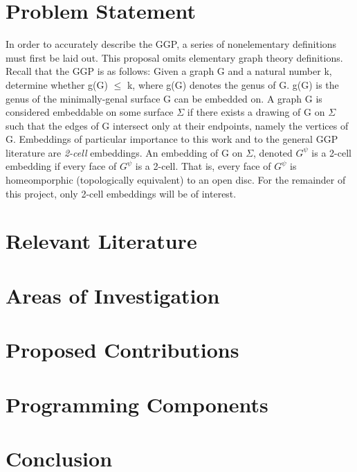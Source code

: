 \documentclass[12pt,conference]{IEEEtran}
\begin{document}
\section{Problem Statement}

In order to accurately describe the GGP, a series of nonelementary definitions must first be laid out. This proposal omits elementary graph theory definitions.
Recall that the GGP is as follows: Given a graph G and a natural number k, determine whether g(G) $\leq$ k, where g(G) denotes the genus of G. g(G) is the genus of the minimally-genal surface G can be embedded on. A graph G is considered embeddable on some surface $\Sigma$ if there exists a drawing of G on $\Sigma$ such that the edges of G intersect only at their endpoints, namely the vertices of G. Embeddings of particular importance to this work and to the general GGP literature are \textit{2-cell} embeddings. An embedding of G on $\Sigma$, denoted $G^{\psi}$ is a 2-cell embedding if every face of $G^{\psi}$ is a 2-cell. That is, every face of $G^{\psi}$ is homeomporphic (topologically equivalent) to an open disc. For the remainder of this project, only 2-cell embeddings will be of interest. 



\section{Relevant Literature}

\section{Areas of Investigation}

\section{Proposed Contributions}

\section{Programming Components}

\section{Conclusion}

\begin{thebibliography}{1}
\end{thebibliography}
\end{document}
